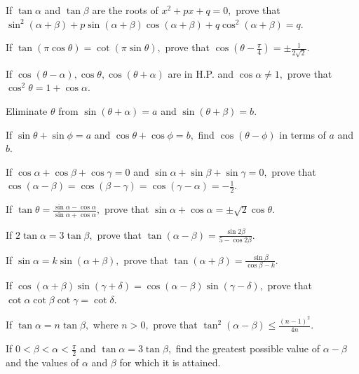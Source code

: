 \item If $\tan\alpha$ and $\tan\beta$ are the roots of $x^2 + px + q = 0,$ prove that $\sin^2(\alpha + \beta) +
    p\sin(\alpha + \beta)\cos(\alpha + \beta) + q\cos^2(\alpha + \beta) = q$.

\item If $\tan(\pi\cos\theta) = \cot(\pi\sin\theta),$ prove that $\cos\left(\theta - \frac{\pi}{4}\right) =
    \pm\frac{1}{2\sqrt{2}}$.

\item If $\cos(\theta - \alpha), \cos\theta, \cos(\theta + \alpha)$ are in H.P. and $\cos\alpha \neq 1,$ prove that
    $\cos^2\theta = 1 + \cos\alpha$.

\item Eliminate $\theta$ from $\sin(\theta + \alpha) = a$ and $\sin(\theta + \beta) = b$.

\item If $\sin\theta + \sin\phi = a$ and $\cos\theta + \cos\phi = b,$ find $\cos(\theta - \phi)$ in terms of $a$ and
    $b$.

\item If $\cos\alpha + \cos\beta + \cos\gamma = 0$ and $\sin\alpha + \sin\beta + \sin\gamma = 0,$ prove that
    $\cos(\alpha - \beta) = \cos(\beta - \gamma) = \cos(\gamma - \alpha) = -\frac{1}{2}$.

\item If $\tan\theta = \frac{\sin\alpha - \cos\alpha}{\sin\alpha + \cos\alpha},$ prove that $\sin\alpha + \cos\alpha =
    \pm\sqrt{2}\cos\theta$.

\item If $2\tan\alpha = 3\tan\beta,$ prove that $\tan(\alpha - \beta) = \frac{\sin 2\beta}{5 - \cos 2\beta}$.

\item If $\sin\alpha = k\sin(\alpha + \beta),$ prove that $\tan(\alpha + \beta) = \frac{\sin\beta}{\cos\beta - k}$.

\item If $\cos(\alpha + \beta)\sin(\gamma + \delta) = \cos(\alpha - \beta)\sin(\gamma - \delta),$ prove that
    $\cot\alpha\cot\beta\cot\gamma = \cot\delta$.

\item If $\tan\alpha = n\tan\beta,$ where $n > 0,$ prove that $\tan^2(\alpha - \beta) \leq \frac{(n - 1)^2}{4n}$.

\item If $0 < \beta < \alpha < \frac{\pi}{2}$ and $\tan\alpha = 3\tan\beta,$ find the greatest possible value of $\alpha
    - \beta$ and the values of $\alpha$ and $\beta$ for which it is attained.

